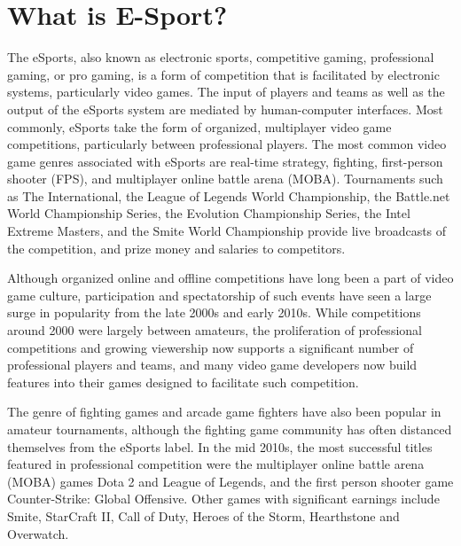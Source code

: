 
\section{What is E-Sport?}
The eSports, also known as electronic sports, competitive gaming, professional gaming, or pro gaming, is a form of competition that is facilitated by electronic systems, particularly video games. The input of players and teams as well as the output of the eSports system are mediated by human-computer interfaces. Most commonly, eSports take the form of organized, multiplayer video game competitions, particularly between professional players. The most common video game genres associated with eSports are real-time strategy, fighting, first-person shooter (FPS), and multiplayer online battle arena (MOBA). Tournaments such as The International, the League of Legends World Championship, the Battle.net World Championship Series, the Evolution Championship Series, the Intel Extreme Masters, and the Smite World Championship provide live broadcasts of the competition, and prize money and salaries to competitors.

Although organized online and offline competitions have long been a part of video game culture, participation and spectatorship of such events have seen a large surge in popularity from the late 2000s and early 2010s. While competitions around 2000 were largely between amateurs, the proliferation of professional competitions and growing viewership now supports a significant number of professional players and teams, and many video game developers now build features into their games designed to facilitate such competition.

The genre of fighting games and arcade game fighters have also been popular in amateur tournaments, although the fighting game community has often distanced themselves from the eSports label. In the mid 2010s, the most successful titles featured in professional competition were the multiplayer online battle arena (MOBA) games Dota 2 and League of Legends, and the first person shooter game Counter-Strike: Global Offensive. Other games with significant earnings include Smite, StarCraft II, Call of Duty, Heroes of the Storm, Hearthstone and Overwatch.

